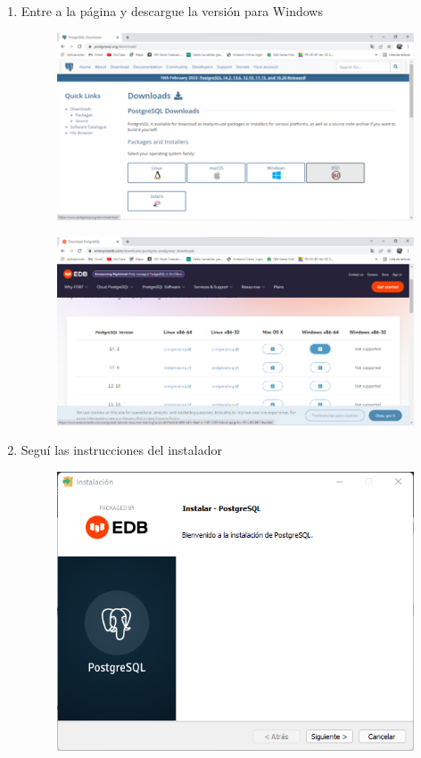 \documentclass{exam}
\begin{document}
    \begin{enumerate}
        \item Entre a la página y descargue la versión para Windows
        \begin{figure}[h]
            \centering
            \includegraphics{imgSalazar/I_01.png}
        \end{figure}
        \begin{figure}[h]
            \centering
            \includegraphics{imgSalazar/I_02.png}
        \end{figure}
        \newpage
        \item Seguí las instrucciones del instalador
        \begin{figure}[h]
            \centering
            \includegraphics[width = 10 cm]{imgSalazar/I_03.png}

\end{figure}
\end{enumerate}
\end{document}
